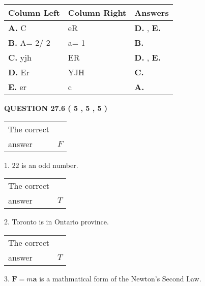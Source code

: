 \documentclass[12pt]{article}
\begin{document}
  
\begin{tabular}{|l|l|l|}
 \hline
 Column Left & Column Right  & Answers       \\ 
 \hline
{\textbf{\large{
A.}}}
C
  & 
eR
 & 
{\textbf{\large{
D.}}}
, 
{\textbf{\large{
E.}}}
 \\ 
 \hline
{\textbf{\large{
B.}}}
 A= %
2/ %
2

  & 
 a= %
1
 & 
{\textbf{\large{
B.}}}
 \\ 
 \hline
{\textbf{\large{
C.}}}
yjh
  & 
ER
 & 
{\textbf{\large{
D.}}}
, 
{\textbf{\large{
E.}}}
 \\ 
 \hline
{\textbf{\large{
D.}}}
Er
  & 
YJH
 & 
{\textbf{\large{
C.}}}
 \\ 
 \hline
{\textbf{\large{
E.}}}
er
  & 
c
 & 
{\textbf{\large{
A.}}}
 \\ 
 \hline
 \end{tabular}
  
  
 
 
 
 
  
\vspace{0.2in}
  
{\textbf{\Large{QUESTION
27.6 
 (           5 ,           5 ,           5 )
}}}
  
  
 
 
\noindent{}

 
\noindent\begin{tabular}{|l|l|}\hline The correct & \\
          answer &  %
$F$ \\ \hline \end{tabular}
1. $ %
22$ is an  %
odd number.
 
\noindent\begin{tabular}{|l|l|}\hline The correct & \\
          answer &  %
$T$ \\ \hline \end{tabular}
2.  %
Toronto is in  %
Ontario province.
 
\noindent\begin{tabular}{|l|l|}\hline The correct & \\
          answer &  %
$T$ \\ \hline \end{tabular}
3.  %
$\mathbf{F}=m\mathbf{a}$ is a mathmatical form of  %
the Newton's Second Law.
 
 
 
\end{document}
